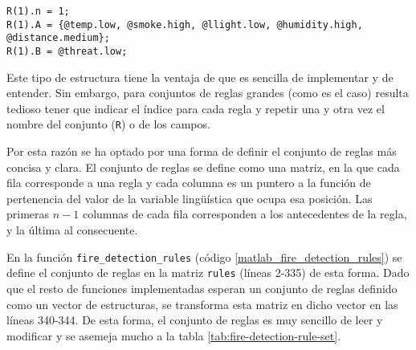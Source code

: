 \begin{lstlisting}
R(1).n = 1;
R(1).A = {@temp.low, @smoke.high, @llight.low, @humidity.high, @distance.medium};
R(1).B = @threat.low;
\end{lstlisting}

Este tipo de estructura tiene la ventaja de que es sencilla de implementar y de entender. Sin embargo, para conjuntos de reglas grandes (como es el caso) resulta tedioso tener que indicar el índice para cada regla y repetir una y otra vez el nombre del conjunto (\lstinline|R|) o de los campos. 

Por esta razón se ha optado por una forma de definir el conjunto de reglas más concisa y clara. El conjunto de reglas se define como una matriz, en la que cada fila corresponde a una regla y cada columna es un puntero a la función de pertenencia del valor de la variable lingüística que ocupa esa posición. Las primeras $n-1$ columnas de cada fila corresponden a los antecedentes de la regla, y la última al consecuente.

En la función  \lstinline|fire_detection_rules| (código \ref{matlab_fire_detection_rules}) se define el conjunto de reglas en la matriz \lstinline|rules| (líneas 2-335) de esta forma. Dado que el resto de funciones implementadas esperan un conjunto de reglas definido como un vector de estructuras, se transforma esta matriz en dicho vector en las líneas 340-344. De esta forma, el conjunto de reglas es muy sencillo de leer y modificar y se asemeja mucho a la tabla \ref{tab:fire-detection-rule-set}.

\lstset{linewidth=18cm}
